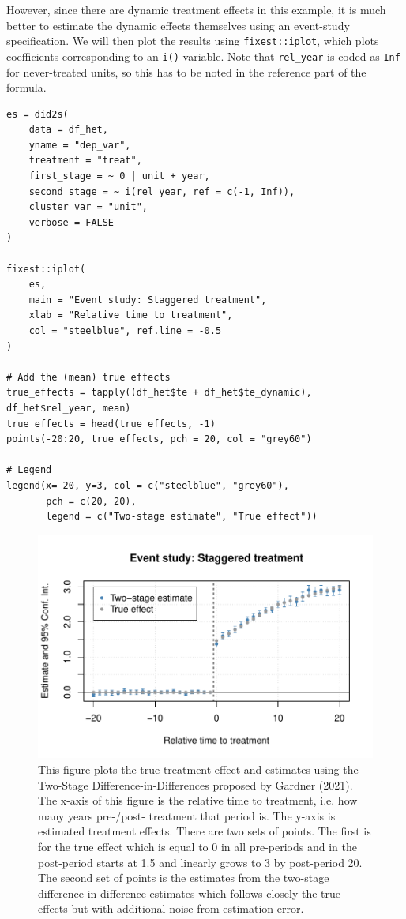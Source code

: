 However, since there are dynamic treatment effects in this example, it is much better to estimate the dynamic effects themselves using an event-study specification. We will then plot the results using \texttt{fixest::iplot}, which plots coefficients corresponding to an \texttt{i()} variable. Note that \texttt{rel\_year} is coded as \texttt{Inf} for never-treated units, so this has to be noted in the reference part of the formula.

\begin{verbatim}
es = did2s(
    data = df_het, 
    yname = "dep_var", 
    treatment = "treat",
    first_stage = ~ 0 | unit + year, 
    second_stage = ~ i(rel_year, ref = c(-1, Inf)),
    cluster_var = "unit", 
    verbose = FALSE
)

fixest::iplot(
    es, 
    main = "Event study: Staggered treatment", 
    xlab = "Relative time to treatment", 
    col = "steelblue", ref.line = -0.5
)

# Add the (mean) true effects
true_effects = tapply((df_het$te + df_het$te_dynamic), df_het$rel_year, mean)
true_effects = head(true_effects, -1)
points(-20:20, true_effects, pch = 20, col = "grey60")

# Legend
legend(x=-20, y=3, col = c("steelblue", "grey60"), 
       pch = c(20, 20), 
       legend = c("Two-stage estimate", "True effect"))
\end{verbatim}

\begin{figure}
\includegraphics[width=1\linewidth]{RJ-2022-048_files/figure-latex/dynamic-1} \caption{This figure plots the true treatment effect and estimates using the Two-Stage Difference-in-Differences proposed by Gardner (2021). The x-axis of this figure is the relative time to treatment, i.e. how many years pre-/post- treatment that period is. The y-axis is estimated treatment effects. There are two sets of points. The first is for the true effect which is equal to 0 in all pre-periods and in the post-period starts at 1.5 and linearly grows to 3 by post-period 20. The second set of points is the estimates from the two-stage difference-in-difference estimates which follows closely the true effects but with additional noise from estimation error.}\label{fig:dynamic}
\end{figure}


